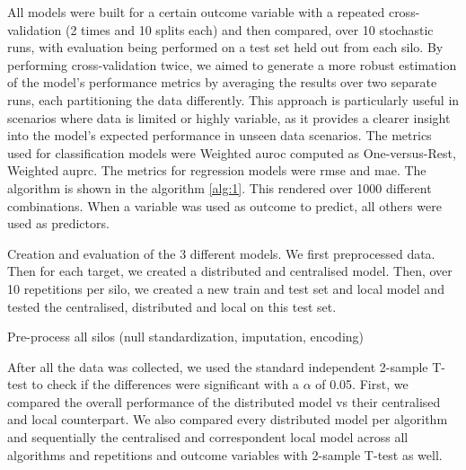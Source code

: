 All models were built for a certain outcome variable with a repeated cross-validation (2 times and 10 splits each) and then compared, over 10 stochastic runs, with evaluation being performed on a test set held out from each silo. By performing cross-validation twice, we aimed to generate a more robust estimation of the model’s performance metrics by averaging the results over two separate runs, each partitioning the data differently. This approach is particularly useful in scenarios where data is limited or highly variable, as it provides a clearer insight into the model's expected performance in unseen data scenarios. The metrics used for classification models were Weighted \ac{auroc} computed as One-versus-Rest, Weighted \ac{auprc}. The metrics for regression models were \ac{rmse} and \ac{mae}. The algorithm is shown in the algorithm \ref{alg:1}. This rendered over 1000 different combinations. When a variable was used as outcome to predict, all others were used as predictors.




\begin{algorithm}[hbtp]
\caption{Creation and evaluation of the 3 different models. We first preprocessed data. Then for each target, we created a distributed and centralised model. Then, over 10 repetitions per silo, we created a new train and test set and local model and tested the centralised, distributed and local on this test set.}
\label{alg:1}
Pre-process all silos (null standardization, imputation, encoding)\;



 \end{algorithm}

After all the data was collected, we used the standard independent 2-sample T-test to check if the differences were significant with a $\alpha$ of 0.05. First, we compared the overall performance of the distributed model vs their centralised and local counterpart.  We also compared every distributed model per algorithm and sequentially the centralised and correspondent local model across all algorithms and repetitions and outcome variables with 2-sample T-test as well.


